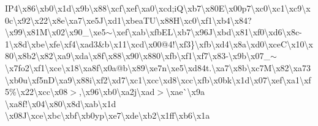 \begin{DoxyCompactItemize}
I\+P4\textbackslash{}x86\textbackslash{}xb0\textbackslash{}x1d\textbackslash{}x9b\textbackslash{}x88\textbackslash{}xcf\textbackslash{}xef\textbackslash{}xa0\textbackslash{}xcd;i\+Q\textbackslash{}xb7\textbackslash{}x80\+E\textbackslash{}x00p7\textbackslash{}xc0\textbackslash{}xc1\textbackslash{}xc9\textbackslash{}x0c\textbackslash{}x92\textbackslash{}x22\textbackslash{}x8e\textbackslash{}xa7\textbackslash{}xe5\+J\textbackslash{}xd1\textbackslash{}xbea\+T\+U\textbackslash{}x88\+H\textquotesingle{}\textbackslash{}xc0\textbackslash{}xf1\textbackslash{}xb4\textbackslash{}x84?\textbackslash{}x99\textbackslash{}x81\+M\textbackslash{}x02\textbackslash{}x90\+\_\+\textbackslash{}xe5$\sim$\textbackslash{}xef\textbackslash{}xab\textbackslash{}xfb\textquotesingle{}\+E\+L\textbackslash{}xb7\textbackslash{}x96\+J\textbackslash{}xbd\textbackslash{}x81\textbackslash{}xf0\textbackslash{}xd6\textbackslash{}x8c-\/1\textbackslash{}x8d\textbackslash{}xbe\textbackslash{}xfe\textbackslash{}xf4\textbackslash{}xad3\&b\textbackslash{}x11\textbackslash{}xcd\textbackslash{}x00@4!\textbackslash{}xf3\}\textbackslash{}xfb\textbackslash{}xd4\textbackslash{}x8a\textbackslash{}xd0\textbackslash{}xce\+C\textbackslash{}x10\textbackslash{}x80\textbackslash{}x8b2\textbackslash{}x82\textbackslash{}xa9\textbackslash{}xda\textbackslash{}x8f\textbackslash{}x88\textbackslash{}x90\textbackslash{}x880\textbackslash{}xfb\textbackslash{}xf1\textbackslash{}xf7\textbackslash{}x83-\/\textbackslash{}x9b\textbackslash{}x07\+\_\+$\sim$\textbackslash{}x7fo2\textbackslash{}xf1\textbackslash{}xce\textbackslash{}x18\textbackslash{}xa8f\textbackslash{}x0a@b\textbackslash{}x89\textbackslash{}xe7n\textbackslash{}xe5\textbackslash{}xd84t.\textbackslash{}xa7\textbackslash{}x8b\textbackslash{}xc7\+M\textbackslash{}x82\textquotesingle{}\textbackslash{}xa73\textbackslash{}xb0u\textbackslash{}xf5n\+D\textbackslash{}xa9\textbackslash{}x88i\textbackslash{}xf2\textbackslash{}xd7\textbackslash{}xc1\textbackslash{}xcc\textbackslash{}xd8\textbackslash{}xcc\textbackslash{}xfb\textbackslash{}x0bk\textbackslash{}x1d\textbackslash{}x07\textbackslash{}xef\textbackslash{}xa1\textbackslash{}xf5\%\textbackslash{}x22\textbackslash{}xcc\textbackslash{}x08$>$,\textbackslash{}x96\textbackslash{}xb0\textbackslash{}xa2j\textbackslash{}xad$>$\textbackslash{}xae\`{}\textbackslash{}x9a \textbackslash{}xa8f!\textbackslash{}x04\textbackslash{}x80\textbackslash{}x8d\textbackslash{}xab\textbackslash{}x1d \textbackslash{}x08\+J\textbackslash{}xce\textbackslash{}xbc\textbackslash{}xbf\textbackslash{}xb0yp\textbackslash{}xe7\textbackslash{}xde\textbackslash{}xb2\textbackslash{}x1ff\textbackslash{}xb6\textbackslash{}x1a 
\end{DoxyCompactItemize}
